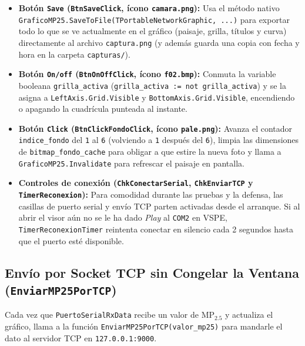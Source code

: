 \documentclass[11pt,a4paper]{article}
\begin{document}
\begin{itemize}[leftmargin=1.5em, itemsep=0.3em]
    \item \textbf{Botón \texttt{Save} (\texttt{BtnSaveClick}, ícono \texttt{camara.png}):}
    Usa el método nativo \texttt{GraficoMP25.SaveToFile(TPortableNetworkGraphic, ...)} para exportar todo lo que se ve actualmente en el gráfico (paisaje, grilla, títulos y curva) directamente al archivo \texttt{captura.png} (y además guarda una copia con fecha y hora en la carpeta \texttt{capturas/}).

    \item \textbf{Botón \texttt{On/off} (\texttt{BtnOnOffClick}, ícono \texttt{f02.bmp}):}
    Conmuta la variable booleana \texttt{grilla\_activa} (\texttt{grilla\_activa := not grilla\_activa}) y se la asigna a \texttt{LeftAxis.Grid.Visible} y \texttt{BottomAxis.Grid.Visible}, encendiendo o apagando la cuadrícula punteada al instante.

    \item \textbf{Botón \texttt{Click} (\texttt{BtnClickFondoClick}, ícono \texttt{pale.png}):}
    Avanza el contador \texttt{indice\_fondo} del \texttt{1} al \texttt{6} (volviendo a \texttt{1} después del \texttt{6}), limpia las dimensiones de \texttt{bitmap\_fondo\_cache} para obligar a que estire la nueva foto y llama a \texttt{GraficoMP25.Invalidate} para refrescar el paisaje en pantalla.

    \item \textbf{Controles de conexión (\texttt{ChkConectarSerial}, \texttt{ChkEnviarTCP} y \texttt{TimerReconexion}):}
    Para comodidad durante las pruebas y la defensa, las casillas de puerto serial y envío TCP parten activadas desde el arranque. Si al abrir el visor aún no se le ha dado \emph{Play} al \texttt{COM2} en VSPE, \texttt{TimerReconexionTimer} reintenta conectar en silencio cada 2 segundos hasta que el puerto esté disponible.
\end{itemize}

\subsection{Envío por Socket TCP sin Congelar la Ventana (\texttt{EnviarMP25PorTCP})}

Cada vez que \texttt{PuertoSerialRxData} recibe un valor de $\text{MP}_{2.5}$ y actualiza el gráfico, llama a la función \texttt{EnviarMP25PorTCP(valor\_mp25)} para mandarle el dato al servidor TCP en \texttt{127.0.0.1:9000}.
\end{document}

